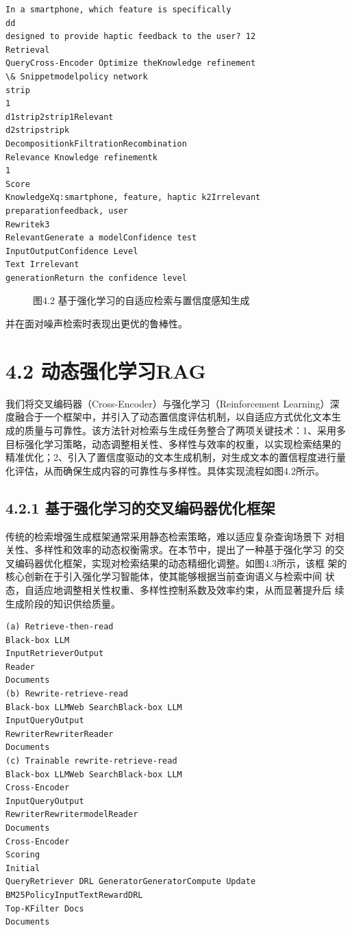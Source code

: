 \documentclass[12pt,a4paper,openright,UTF8]{ctexbook}
\begin{document}
\begin{lstlisting}
In a smartphone, which feature is specifically
dd
designed to provide haptic feedback to the user? 12
Retrieval
QueryCross-Encoder Optimize theKnowledge refinement
\& Snippetmodelpolicy network
strip
1
d1strip2strip1Relevant
d2stripstripk
DecompositionkFiltrationRecombination
Relevance Knowledge refinementk
1
Score
KnowledgeXq:smartphone, feature, haptic k2Irrelevant
preparationfeedback, user
Rewritek3
RelevantGenerate a modelConfidence test
InputOutputConfidence Level
Text Irrelevant
generationReturn the confidence level
\end{lstlisting}

\begin{figure}[htbp]
\centering
{}
\caption{图4.2 基于强化学习的自适应检索与置信度感知生成}
\end{figure}

并在面对噪声检索时表现出更优的鲁棒性。

\section{4.2 动态强化学习RAG}

我们将交叉编码器（Cross-Encoder）与强化学习（Reinforcement Learning）深 度融合于一个框架中，并引入了动态置信度评估机制，以自适应方式优化文本生 成的质量与可靠性。该方法针对检索与生成任务整合了两项关键技术：1、采用多 目标强化学习策略，动态调整相关性、多样性与效率的权重，以实现检索结果的 精准优化；2、引入了置信度驱动的文本生成机制，对生成文本的置信程度进行量 化评估，从而确保生成内容的可靠性与多样性。具体实现流程如图4.2所示。

\subsection{4.2.1 基于强化学习的交叉编码器优化框架}

传统的检索增强生成框架通常采用静态检索策略，难以适应复杂查询场景下 对相关性、多样性和效率的动态权衡需求。在本节中，提出了一种基于强化学习 的交叉编码器优化框架，实现对检索结果的动态精细化调整。如图4.3所示，该框 架的核心创新在于引入强化学习智能体，使其能够根据当前查询语义与检索中间 状态，自适应地调整相关性权重、多样性控制系数及效率约束，从而显著提升后 续生成阶段的知识供给质量。

\begin{lstlisting}
(a) Retrieve-then-read
Black-box LLM
InputRetrieverOutput
Reader
Documents
(b) Rewrite-retrieve-read
Black-box LLMWeb SearchBlack-box LLM
InputQueryOutput
RewriterRewriterReader
Documents
(c) Trainable rewrite-retrieve-read
Black-box LLMWeb SearchBlack-box LLM
Cross-Encoder
InputQueryOutput
RewriterRewritermodelReader
Documents
Cross-Encoder
Scoring
Initial
QueryRetriever DRL GeneratorGeneratorCompute Update
BM25PolicyInputTextRewardDRL
Top-KFilter Docs
Documents
\end{lstlisting}
\end{document}
